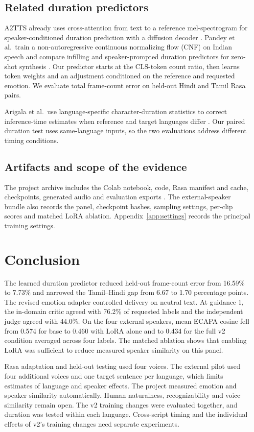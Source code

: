 \documentclass[11pt,a4paper]{article}
\newcommand{\sectionpage}[1]{\clearpage\section{#1}}
\begin{document}
\subsection{Related duration predictors}
A2TTS already uses cross-attention from text to a reference mel-spectrogram for speaker-conditioned duration prediction with a diffusion decoder \cite{a2tts}. Pandey et al.\ train a non-autoregressive continuous normalizing flow (CNF) on Indian speech and compare infilling and speaker-prompted duration predictors for zero-shot synthesis \cite{pandey}. Our predictor starts at the CLS-token count ratio, then learns token weights and an adjustment conditioned on the reference and requested emotion. We evaluate total frame-count error on held-out Hindi and Tamil Rasa pairs.

Arigala et al.\ use language-specific character-duration statistics to correct inference-time estimates when reference and target languages differ \cite{arigala}. Our paired duration test uses same-language inputs, so the two evaluations address different timing conditions.

\subsection{Artifacts and scope of the evidence}
The project archive includes the Colab notebook, code, Rasa manifest and cache, checkpoints, generated audio and evaluation exports \cite{artifacts}. The external-speaker bundle also records the panel, checkpoint hashes, sampling settings, per-clip scores and matched LoRA ablation. Appendix~\ref{app:settings} records the principal training settings.

\sectionpage{Conclusion}
The learned duration predictor reduced held-out frame-count error from 16.59\% to 7.73\% and narrowed the Tamil--Hindi gap from 6.67 to 1.70 percentage points. The revised emotion adapter controlled delivery on neutral text. At guidance 1, the in-domain critic agreed with 76.2\% of requested labels and the independent judge agreed with 44.0\%. On the four external speakers, mean ECAPA cosine fell from 0.574 for base to 0.460 with LoRA alone and to 0.434 for the full v2 condition averaged across four labels. The matched ablation shows that enabling LoRA was sufficient to reduce measured speaker similarity on this panel.

Rasa adaptation and held-out testing used four voices. The external pilot used four additional voices and one target sentence per language, which limits estimates of language and speaker effects. The project measured emotion and speaker similarity automatically. Human naturalness, recognizability and voice similarity remain open. The v2 training changes were evaluated together, and duration was tested within each language. Cross-script timing and the individual effects of v2's training changes need separate experiments.
\end{document}
